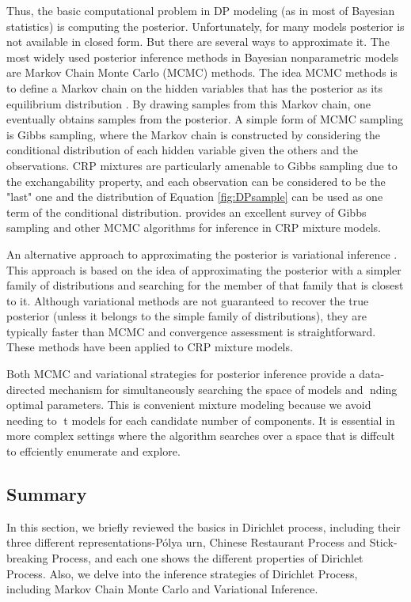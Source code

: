 \documentclass[a4paper,14pt]{article}
\begin{document}
Thus, the basic computational problem in DP modeling (as in most of Bayesian statistics) is computing the posterior\cite{Neal2000}. Unfortunately, for many models posterior is not available in closed form. But there are several ways to approximate it. The most widely used posterior inference methods in Bayesian nonparametric models are
Markov Chain Monte Carlo (MCMC) methods. The idea MCMC methods is to define a Markov chain on the hidden variables that has the posterior as its equilibrium distribution \cite{Andrieu2003}. By drawing samples from this Markov chain, one eventually obtains samples from the posterior. A simple form of MCMC sampling is Gibbs sampling, where the Markov chain is constructed by considering the conditional distribution of each hidden variable given the others and the observations. CRP mixtures are
particularly amenable to Gibbs sampling due to the exchangability property, and each observation can be considered to be the "last" one and the distribution of Equation \ref{fig:DPsample} can be used as one term of the conditional distribution. \cite{Andrieu2003} provides an excellent survey of Gibbs sampling and other MCMC
algorithms for inference in CRP mixture models.

An alternative approach to approximating the posterior is variational inference \cite{Jordan1999}. This approach is based on the idea of approximating the posterior with a simpler family of distributions and searching for the member of that family that
is closest to it. Although variational methods are not guaranteed to recover the true posterior (unless it belongs to the simple family of distributions), they are typically faster than MCMC \cite{Blei2006}and convergence assessment is straightforward. These methods have been applied to CRP mixture
models. 

Both MCMC and variational strategies for posterior inference provide a data-directed mechanism for simultaneously searching the space of models and nding optimal parameters. This is convenient  mixture modeling because we avoid needing to t models for each candidate number of components. It is essential in more complex settings where the algorithm searches over a space that is diffcult to effciently enumerate and explore.



\subsection{Summary}

In this section, we briefly reviewed the basics in Dirichlet process, including their three different representations-P\'{o}lya urn, Chinese Restaurant Process and Stick-breaking Process, and each one shows the different properties of Dirichlet Process. Also, we delve into the inference strategies of Dirichlet Process, including Markov Chain Monte Carlo and Variational Inference. 
\end{document}
